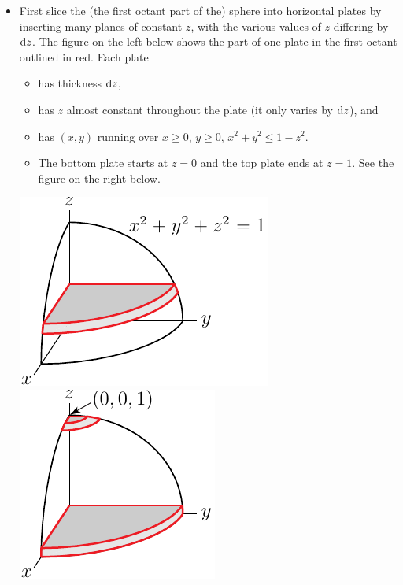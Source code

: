 \begin{eg}
\begin{wfig}
\begin{center}
\end{center}
\end{wfig}
\begin{itemize}
\item
First slice the (the first octant part of the) sphere into horizontal 
plates by inserting many planes of
constant $z$, with the various values of $z$ differing by $\mathrm{d}z$.
The figure on the left below shows the part of one plate in the first octant
outlined in red. Each plate
\vspace{-\topsep}
\begin{itemize} \itemsep1pt \parskip0pt 
\item
has thickness $\mathrm{d}z$, 
\item
has $z$ almost constant throughout the plate (it only varies by $\mathrm{d}z$), and 
\item
has $(x,y)$ running over $x\ge 0$, $y\ge 0$, $x^2+y^2\le 1-z^2$.
\item 
The bottom plate starts at $z=0$ and the top plate ends at 
$z=1$. See the figure on the right below.
\end{itemize}
\begin{efig}
\begin{center}
    \includegraphics{sphereMass1.pdf}\qquad
    \includegraphics{sphereMass1a.pdf}
\end{center}
\end{efig}
\vspace{-\topsep}


\end{itemize}
\end{eg}
